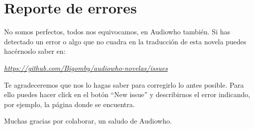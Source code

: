\cleardoublepage

\section*{Reporte de errores}

No somos perfectos, todos nos equivocamos, en Audiowho también. Si has detectado un error o algo que no cuadra en la traducción de esta novela puedes hacérnoslo saber en:

\mbox{}

\begin{center}
\href{https://github.com/Bigomby/audiowho-novelas/issues}{\textit{https://github.com/Bigomby/audiowho-novelas/issues}}
\end{center}

\mbox{}

Te agradeceremos que nos lo hagas saber para corregirlo lo antes posible. Para ello puedes hacer click en el botón “New issue” y describirnos el error indicando, por ejemplo, la página donde se encuentra.

\mbox{}

Muchas gracias por colaborar, un saludo de Audiowho.